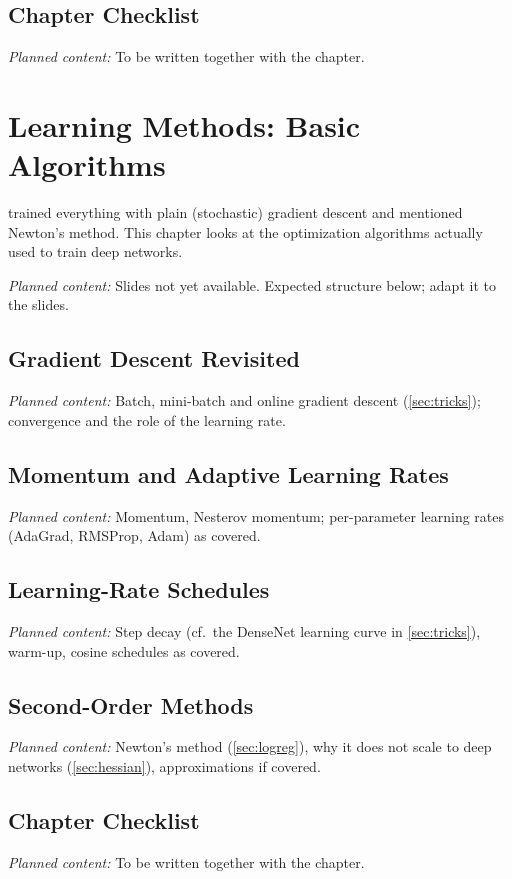 \documentclass[11pt, oneside]{book}
\newcommand{\planned}[1]{%
  \par{\small\color{gray!70!black}\textit{Planned content:} #1}\par}
\let\originalsection\section
\renewcommand{\section}{\Needspace{7\baselineskip}\originalsection}
\begin{document}
\section{Chapter Checklist}
\planned{To be written together with the chapter.}


\chapter{Learning Methods: Basic Algorithms}
\label{ch:learning}

 trained everything with plain (stochastic) gradient descent
and mentioned Newton's method. This chapter looks at the optimization
algorithms actually used to train deep networks.

\planned{Slides not yet available. Expected structure below; adapt it to the
slides.}

\section{Gradient Descent Revisited}
\planned{Batch, mini-batch and online gradient descent
(\cref{sec:tricks}); convergence and the role of the learning rate.}

\section{Momentum and Adaptive Learning Rates}
\planned{Momentum, Nesterov momentum; per-parameter learning rates
(AdaGrad, RMSProp, Adam) as covered.}

\section{Learning-Rate Schedules}
\planned{Step decay (cf.\ the DenseNet learning curve in \cref{sec:tricks}),
warm-up, cosine schedules as covered.}

\section{Second-Order Methods}
\planned{Newton's method (\cref{sec:logreg}), why it does not scale to deep
networks (\cref{sec:hessian}), approximations if covered.}

\section{Chapter Checklist}
\planned{To be written together with the chapter.}
\end{document}
